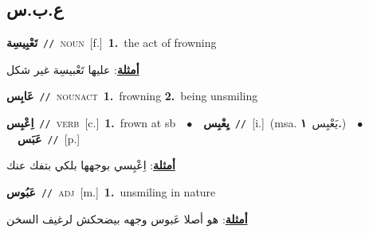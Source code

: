 \documentclass[10pt,a4paper,twoside]{article} %
\begin{document}
\begin{multicols}{2}
{{{{{\vspace{-3mm}
\subsection*{\color{blue}\foreignlanguage{arabic}{ع.ب.س}\color{blue}{}} 

{\setlength\topsep{0pt}\textbf{\foreignlanguage{arabic}{تَعْبِيسِة}}\ {\color{gray}\texttt{//}\color{black}}\ \textsc{noun}\ [f.]\ \textbf{1.}~the act of frowning\  \begin{flushright}\color{gray}\foreignlanguage{arabic}{\textbf{\underline{\foreignlanguage{arabic}{أمثلة}}}: عليها تَعْبيسِة غير شكل}\end{flushright}\color{black}} \vspace{2mm}

{\setlength\topsep{0pt}\textbf{\foreignlanguage{arabic}{عَابِس}}\ {\color{gray}\texttt{//}\color{black}}\ \textsc{noun\textunderscore act}\ \textbf{1.}~frowning  \textbf{2.}~being unsmiling\ 

{\setlength\topsep{0pt}\textbf{\foreignlanguage{arabic}{اِعْبِس}}\ {\color{gray}\texttt{//}\color{black}}\ \textsc{verb}\ [c.]\ \textbf{1.}~frown at sb\ \ $\bullet$\ \ \setlength\topsep{0pt}\textbf{\foreignlanguage{arabic}{يِعْبِس}}\ {\color{gray}\texttt{//}\color{black}}\ [i.]\ \color{gray}(msa. \foreignlanguage{arabic}{يَعْبِس}~\foreignlanguage{arabic}{\textbf{١.}})\color{black}\ \ $\bullet$\ \ \setlength\topsep{0pt}\textbf{\foreignlanguage{arabic}{عَبَس}}\ {\color{gray}\texttt{//}\color{black}}\ [p.]\  \begin{flushright}\color{gray}\foreignlanguage{arabic}{\textbf{\underline{\foreignlanguage{arabic}{أمثلة}}}: اِعْبِسي بوجهها بلكي بتفك عنك}\end{flushright}\color{black}} \vspace{2mm}

{\setlength\topsep{0pt}\textbf{\foreignlanguage{arabic}{عَبُوس}}\ {\color{gray}\texttt{//}\color{black}}\ \textsc{adj}\ [m.]\ \textbf{1.}~unsmiling in nature\  \begin{flushright}\color{gray}\foreignlanguage{arabic}{\textbf{\underline{\foreignlanguage{arabic}{أمثلة}}}: هو أصلا عَبوس وجهه بيضحكش لرغيف السخن}\end{flushright}\color{black}} \vspace{2mm}

}}}}}}
\end{multicols}
\end{document}
